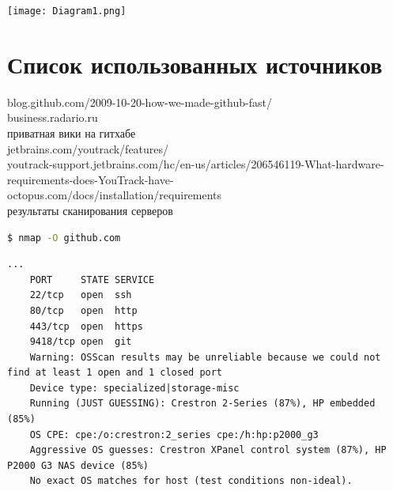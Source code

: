 \documentclass{article}
\begin{document}
\texttt{[image: Diagram1.png]}

\pagebreak

\section{Список использованных источников}
blog.github.com/2009-10-20-how-we-made-github-fast/\\
business.radario.ru\\
приватная вики на гитхабе\\
jetbrains.com/youtrack/features/\\
youtrack-support.jetbrains.com/hc/en-us/articles/206546119-What-hardware-requirements-does-YouTrack-have-\\
octopus.com/docs/installation/requirements\\

результаты сканирования серверов
\begin{lstlisting}[language=bash, basicstyle=\ttfamily\small]
    $ nmap -O github.com
\end{lstlisting}
\begin{lstlisting}[frame=lines, basicstyle=\ttfamily\small]
    ...
    PORT     STATE SERVICE
    22/tcp   open  ssh
    80/tcp   open  http
    443/tcp  open  https
    9418/tcp open  git
    Warning: OSScan results may be unreliable because we could not find at least 1 open and 1 closed port
    Device type: specialized|storage-misc
    Running (JUST GUESSING): Crestron 2-Series (87%), HP embedded (85%)
    OS CPE: cpe:/o:crestron:2_series cpe:/h:hp:p2000_g3
    Aggressive OS guesses: Crestron XPanel control system (87%), HP P2000 G3 NAS device (85%)
    No exact OS matches for host (test conditions non-ideal).
\end{lstlisting}
\end{document}

